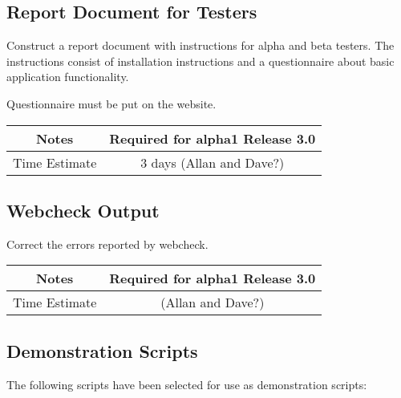 \documentclass[12pt]{article}
\begin{document}
\subsection{Report Document for Testers}

Construct a report document with instructions for alpha and beta
testers.  The instructions consist of installation instructions and a
questionnaire about basic application functionality.

Questionnaire must be put on the website.


{
  \vspace{5mm}
  \centering
  \begin{tabular}{|c|c|}
    \hline
    Notes
    & Required for alpha1 Release 3.0 \\
    \hline
    Time Estimate
    & 3 days (Allan and Dave?) \\
    \hline
  \end{tabular}
}


\subsection{Webcheck Output}

Correct the errors reported by webcheck.

{
  \vspace{5mm}
  \centering
  \begin{tabular}{|c|c|}
    \hline
    Notes
    & Required for alpha1 Release 3.0 \\
    \hline
    Time Estimate
    & (Allan and Dave?) \\
    \hline
  \end{tabular}
}


\subsection{Demonstration Scripts}

The following scripts have been selected for use as demonstration
scripts:
\end{document}
